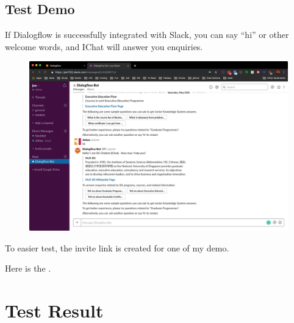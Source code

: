 
\section{Test Demo} %
\label{sec:test}

	If Dialogflow is successfully integrated with Slack, you can say “hi” or other welcome words, and IChat will answer you enquiries.

	\begin{figure}[H]
		\centering
		\includegraphics[width=\linewidth, frame]{img/manual_18.jpg}
	\end{figure}

	To easier test, the invite link is created for one of my demo.

	Here is the \href{https://join.slack.com/t/joe1122/shared_invite/enQtNjQxNTQ0MTY0Nzg1LTM3NDI3NGZjYWQzMjQ4YTJjMGIxZmQ4Y2VkMWYzNDAxOTQ0OTFlMmFjMzIzNDgyZjNkY2Q5YzQ2MjVlOTlmYWI}{}.


\chapter{Test Result} %
\label{cha:test_result}


